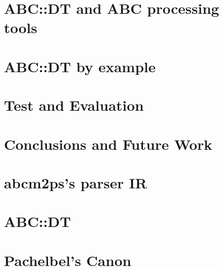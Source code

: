 \documentclass[12pt,a4paper,twoside]{book} %
\begin{document}
  \chapter{ABC::DT and ABC processing tools}
  

  \chapter{ABC::DT by example}
  \label{chap:abc_dt_by_example}
  

  \chapter{Test and Evaluation}
  \label{chap:test_eval}
  

  \chapter{Conclusions and Future Work}
  \label{chap:conclusions_future_work}
  

  

  \cleardoublepage
  \renewcommand\bibname{References}

  \nocite{*}
  
  
  \appendix
\thispagestyle{plain}
  \chapter{abcm2ps's parser IR}
  

  \chapter{ABC::DT}
  

  \chapter{Pachelbel's Canon}
  
\end{document}
